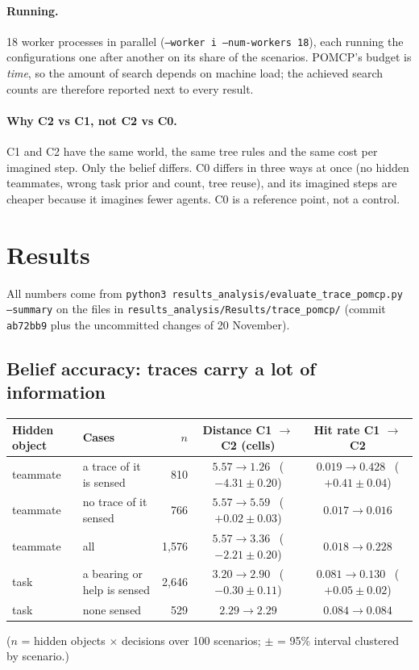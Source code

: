 \documentclass[11pt,a4paper]{article}
\newcommand{\file}{\nolinkurl}  %
\newcommand{\code}[1]{\texttt{#1}}
\theoremstyle{remark}
\begin{document}
\paragraph{Running.} 18 worker processes in parallel (\code{--worker i --num-workers 18}), each running the
configurations one after another on its share of the scenarios. POMCP's budget is \emph{time}, so the amount of search
depends on machine load; the achieved search counts are therefore reported next to every result.

\paragraph{Why C2 vs C1, not C2 vs C0.} C1 and C2 have the same world, the same tree rules and the same cost per
imagined step. Only the belief differs. C0 differs in three ways at once (no hidden teammates, wrong task prior and count,
tree reuse), and its imagined steps are cheaper because it imagines fewer agents. C0 is a reference point, not a control.

\section{Results}
\label{sec:results}

All numbers come from \code{python3 results\_analysis/evaluate\_trace\_pomcp.py --summary} on the files in
\file{results_analysis/Results/trace_pomcp/} (commit \code{ab72bb9} plus the uncommitted changes of 20 November).

\subsection{Belief accuracy: traces carry a lot of information}

\begin{center}
\small
\setlength{\tabcolsep}{4pt}
\begin{tabular}{lp{2.6cm}rcc}
\toprule
Hidden object & Cases & $n$ & Distance C1 $\to$ C2 (cells) & Hit rate C1 $\to$ C2 \\
\midrule
teammate & a trace of it is sensed & 810 & $5.57 \to \mathbf{1.26}$ \ ($-4.31\pm0.20$) & $0.019 \to \mathbf{0.428}$ \ ($+0.41\pm0.04$)\\
teammate & no trace of it sensed & 766 & $5.57 \to 5.59$ \ ($+0.02\pm0.03$) & $0.017 \to 0.016$\\
teammate & all & 1{,}576 & $5.57 \to 3.36$ \ ($-2.21\pm0.20$) & $0.018 \to 0.228$\\
task & a bearing or help is sensed & 2{,}646 & $3.20 \to 2.90$ \ ($-0.30\pm0.11$) & $0.081 \to 0.130$ \ ($+0.05\pm0.02$)\\
task & none sensed & 529 & $2.29 \to 2.29$ & $0.084 \to 0.084$\\
\bottomrule
\end{tabular}
\end{center}
\setlength{\tabcolsep}{6pt}($n$ = hidden objects $\times$ decisions over 100 scenarios; $\pm$ = 95\% interval clustered by scenario.)
\end{document}
